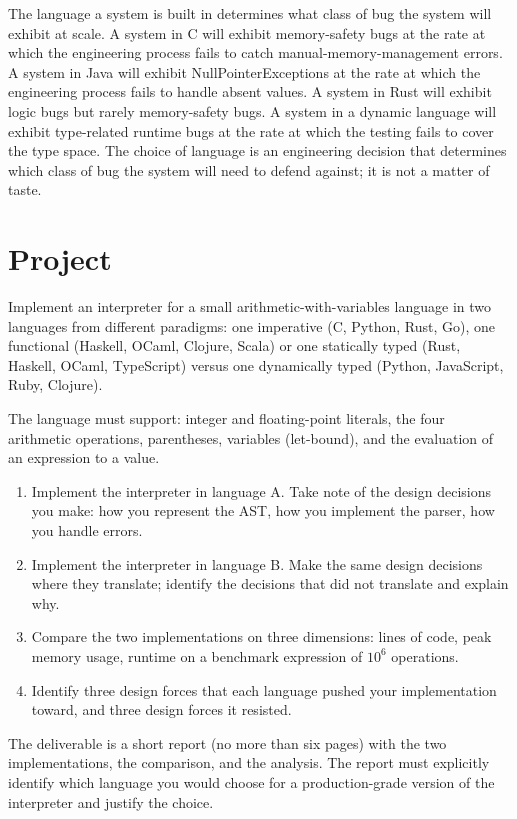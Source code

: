 \begin{principle}
The language a system is built in determines what class of bug the system will exhibit at scale. A system in C will exhibit memory-safety bugs at the rate at which the engineering process fails to catch manual-memory-management errors. A system in Java will exhibit NullPointerExceptions at the rate at which the engineering process fails to handle absent values. A system in Rust will exhibit logic bugs but rarely memory-safety bugs. A system in a dynamic language will exhibit type-related runtime bugs at the rate at which the testing fails to cover the type space. The choice of language is an engineering decision that determines which class of bug the system will need to defend against; it is not a matter of taste.
\end{principle}

\section{Project}

\begin{project}
Implement an interpreter for a small arithmetic-with-variables language in two languages from different paradigms: one imperative (C, Python, Rust, Go), one functional (Haskell, OCaml, Clojure, Scala) or one statically typed (Rust, Haskell, OCaml, TypeScript) versus one dynamically typed (Python, JavaScript, Ruby, Clojure).

The language must support: integer and floating-point literals, the four arithmetic operations, parentheses, variables (let-bound), and the evaluation of an expression to a value.

\begin{enumerate}[leftmargin=*]
  \item Implement the interpreter in language A. Take note of the design decisions you make: how you represent the AST, how you implement the parser, how you handle errors.
  \item Implement the interpreter in language B. Make the same design decisions where they translate; identify the decisions that did not translate and explain why.
  \item Compare the two implementations on three dimensions: lines of code, peak memory usage, runtime on a benchmark expression of $10^6$ operations.
  \item Identify three design forces that each language pushed your implementation toward, and three design forces it resisted.
\end{enumerate}

The deliverable is a short report (no more than six pages) with the two implementations, the comparison, and the analysis. The report must explicitly identify which language you would choose for a production-grade version of the interpreter and justify the choice.
\end{project}

